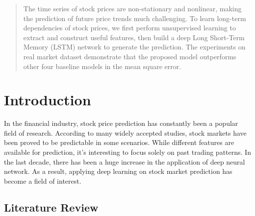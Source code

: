 \documentclass{article}
\begin{document}
 


\begin{abstract} 
The time series of stock prices are non-stationary and nonlinear, making the prediction of future price trends much challenging. To learn long-term dependencies of stock prices, we first perform unsupervised learning to extract and construct useful features, then build a deep Long Short-Term Memory (LSTM) network to generate the prediction. The experiments on real market dataset demonstrate that the proposed model outperforms other four baseline models in the mean square error.
\end{abstract} 

\section{Introduction}

In the financial industry, stock price prediction has constantly been a popular field of research. According to many widely accepted studies, stock markets have been proved to be predictable in some scenarios. While different features are available for prediction, it's interesting to focus solely on past trading patterns. In the last decade, there has been a huge increase in the application of deep neural network. As a result, applying deep learning on stock market prediction has become a field of interest.

\subsection{Literature Review}
\end{document}
